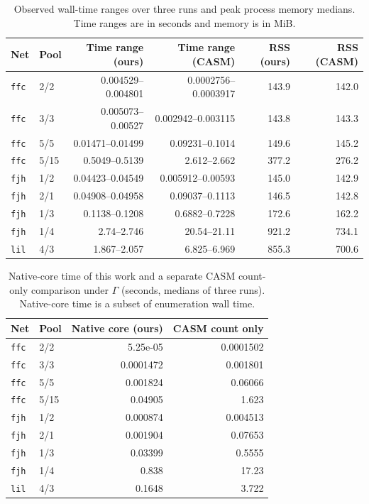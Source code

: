 \documentclass[a5paper, 10pt]{article}
\begin{document}
\begin{table}[H]
\centering\scriptsize
\setlength{\tabcolsep}{1.2mm}
\caption{Observed wall-time ranges over three runs and peak process memory medians. Time ranges are in seconds and memory is in MiB.}
\begin{tabular}{llrrrr}
\toprule
Net & Pool & Time range (ours) & Time range (CASM) & RSS (ours) & RSS (CASM) \\
\midrule
\texttt{ffc} & 2/2 & 0.004529--0.004801 & 0.0002756--0.0003917 & 143.9 & 142.0 \\
\texttt{ffc} & 3/3 & 0.005073--0.00527 & 0.002942--0.003115 & 143.8 & 143.3 \\
\texttt{ffc} & 5/5 & 0.01471--0.01499 & 0.09231--0.1014 & 149.6 & 145.2 \\
\texttt{ffc} & 5/15 & 0.5049--0.5139 & 2.612--2.662 & 377.2 & 276.2 \\
\texttt{fjh} & 1/2 & 0.04423--0.04549 & 0.005912--0.00593 & 145.0 & 142.9 \\
\texttt{fjh} & 2/1 & 0.04908--0.04958 & 0.09037--0.1113 & 146.5 & 142.8 \\
\texttt{fjh} & 1/3 & 0.1138--0.1208 & 0.6882--0.7228 & 172.6 & 162.2 \\
\texttt{fjh} & 1/4 & 2.74--2.746 & 20.54--21.11 & 921.2 & 734.1 \\
\texttt{lil} & 4/3 & 1.867--2.057 & 6.825--6.969 & 855.3 & 700.6 \\
\bottomrule
\end{tabular}
\end{table}

\begin{table}[H]
\centering\scriptsize
\setlength{\tabcolsep}{1.2mm}
\caption{Native-core time of this work and a separate CASM count-only comparison under $\Gamma$ (seconds, medians of three runs). Native-core time is a subset of enumeration wall time.}
\begin{tabular}{llrr}
\toprule
Net & Pool & Native core (ours) & CASM count only \\
\midrule
\texttt{ffc} & 2/2 & 5.25e-05 & 0.0001502 \\
\texttt{ffc} & 3/3 & 0.0001472 & 0.001801 \\
\texttt{ffc} & 5/5 & 0.001824 & 0.06066 \\
\texttt{ffc} & 5/15 & 0.04905 & 1.623 \\
\texttt{fjh} & 1/2 & 0.000874 & 0.004513 \\
\texttt{fjh} & 2/1 & 0.001904 & 0.07653 \\
\texttt{fjh} & 1/3 & 0.03399 & 0.5555 \\
\texttt{fjh} & 1/4 & 0.838 & 17.23 \\
\texttt{lil} & 4/3 & 0.1648 & 3.722 \\
\bottomrule
\end{tabular}
\end{table}
\end{document}
